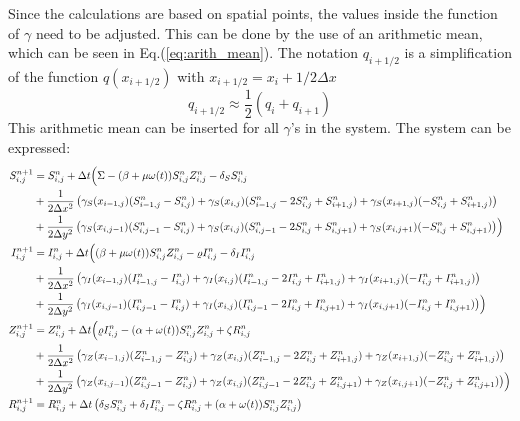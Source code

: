 \documentclass[%
twoside,                 %
final,                   %
chapterprefix=true,      %
open=right               %
10pt]{book}
\begin{document}
Since the calculations are based on spatial points, the values inside the function of $\gamma$ need to be adjusted. This can be done by the use of an arithmetic mean, which can be seen in Eq.(\ref{eq:arith_mean}). The notation $q_{i+1/2}$ is a simplification of the function $q(x_{i+1/2})$ with $x_{i+1/2} = x_i + 1/2 \Delta x$
\begin{equation} \label{eq:arith_mean}
q_{i+1/2} \approx \frac{1}{2}(q_i +q_{i+1})
\end{equation}
This arithmetic mean can be inserted for all $\gamma$'s in the system. The system can be expressed:
\begin{equation} \label{eq:SIZR_disc3}
	\begin{aligned}
    S^{n+1}_{i,j}   &= S^n_{i,j} + \Delta t \Bigl( \Sigma - (\beta+\mu \omega(t))S^{n}_{i,j}Z^{n}_{i,j}- \delta_S S^{n}_{i,j} \\
                    &+ \frac{1}{2\Delta x^2}\left(\gamma_S(x_{i-1,j})(S^{n}_{i-1,j}-S^{n}_{i,j})+\gamma_S(x_{i,j})(S^{n}_{i-1,j}-2S^{n}_{i,j}+S^{n}_{i+1,j})+\gamma_S(x_{i+1,j})(-S^{n}_{i,j}+S^{n}_{i+1,j})\right) \\
                    &+ \frac{1}{2\Delta y^2}\left(\gamma_S(x_{i,j-1})(S^{n}_{i,j-1}-S^{n}_{i,j})+\gamma_S(x_{i,j})(S^{n}_{i,j-1}-2S^{n}_{i,j}+S^{n}_{i,j+1})+\gamma_S(x_{i,j+1})(-S^{n}_{i,j}+S^{n}_{i,j+1})\right)\Bigr)\\
    I^{n+1}_{i,j}   &= I^n_{i,j} + \Delta t \Bigl((\beta+\mu \omega(t))S^{n}_{i,j}Z^{n}_{i,j}-\varrho I^{n}_{i,j}- \delta_I I^{n}_{i,j} \\
                    &+ \frac{1}{2\Delta x^2}\left(\gamma_I(x_{i-1,j})(I^{n}_{i-1,j}-I^{n}_{i,j})+\gamma_I(x_{i,j})(I^{n}_{i-1,j}-2I^{n}_{i,j}+I^{n}_{i+1,j})+\gamma_I(x_{i+1,j})(-I^{n}_{i,j}+I^{n}_{i+1,j})\right) \\
                    &+ \frac{1}{2\Delta y^2}\left(\gamma_I(x_{i,j-1})(I^{n}_{i,j-1}-I^{n}_{i,j})+\gamma_I(x_{i,j})(I^{n}_{i,j-1}-2I^{n}_{i,j}+I^{n}_{i,j+1})+\gamma_I(x_{i,j+1})(-I^{n}_{i,j}+I^{n}_{i,j+1})\right)\Bigr)\\
    Z^{n+1}_{i,j}   &= Z^n_{i,j} +\Delta t \Bigl( \varrho I^{n}_{i,j}-(\alpha+\omega(t))S^{n}_{i,j}Z^{n}_{i,j}+ \zeta R^{n}_{i,j} \\
                    &+ \frac{1}{2\Delta x^2}\left(\gamma_Z(x_{i-1,j})(Z^{n}_{i-1,j}-Z^{n}_{i,j})+\gamma_Z(x_{i,j})(Z^{n}_{i-1,j}-2Z^{n}_{i,j}+Z^{n}_{i+1,j})+\gamma_Z(x_{i+1,j})(-Z^{n}_{i,j}+Z^{n}_{i+1,j})\right) \\
                    &+ \frac{1}{2\Delta y^2}\left(\gamma_Z(x_{i,j-1})(Z^{n}_{i,j-1}-Z^{n}_{i,j})+\gamma_Z(x_{i,j})(Z^{n}_{i,j-1}-2Z^{n}_{i,j}+Z^{n}_{i,j+1})+\gamma_Z(x_{i,j+1})(-Z^{n}_{i,j}+Z^{n}_{i,j+1})\right)\Bigr)\\
    R^{n+1}_{i,j}   &= R^n_{i,j} +\Delta t \left(\delta_S S^{n}_{i,j}+\delta_I I^{n}_{i,j}-\zeta R^{n}_{i,j}+(\alpha+\omega(t))S^{n}_{i,j}Z^{n}_{i,j}\right)
	\end{aligned}
\end{equation}
\end{document}
